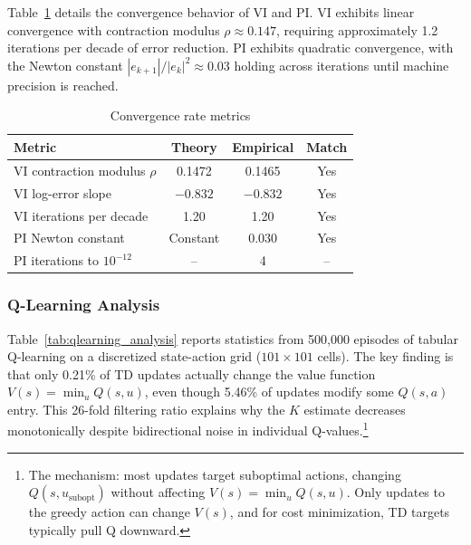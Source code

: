 Table~\ref{tab:convergence_rates} details the convergence behavior of VI and PI. VI exhibits linear convergence with contraction modulus $\rho \approx 0.147$, requiring approximately 1.2 iterations per decade of error reduction. PI exhibits quadratic convergence, with the Newton constant $|e_{k+1}|/|e_k|^2 \approx 0.03$ holding across iterations until machine precision is reached.

\begin{table}[h!]
\centering
\caption{Convergence rate metrics}
\label{tab:convergence_rates}
\begin{tabular}{l|c|c|c}
\hline
Metric & Theory & Empirical & Match \\
\hline
VI contraction modulus $\rho$ & 0.1472 & 0.1465 & Yes \\
VI log-error slope & $-0.832$ & $-0.832$ & Yes \\
VI iterations per decade & 1.20 & 1.20 & Yes \\
PI Newton constant & Constant & 0.030 & Yes \\
PI iterations to $10^{-12}$ & -- & 4 & -- \\
\hline
\end{tabular}
\end{table}

\subsubsection{Q-Learning Analysis}

Table~\ref{tab:qlearning_analysis} reports statistics from 500,000 episodes of tabular Q-learning on a discretized state-action grid ($101 \times 101$ cells). The key finding is that only 0.21\% of TD updates actually change the value function $V(s) = \min_u Q(s,u)$, even though 5.46\% of updates modify some $Q(s,a)$ entry. This 26-fold filtering ratio explains why the $K$ estimate decreases monotonically despite bidirectional noise in individual Q-values.\footnote{The mechanism: most updates target suboptimal actions, changing $Q(s, u_{\text{subopt}})$ without affecting $V(s) = \min_u Q(s,u)$. Only updates to the greedy action can change $V(s)$, and for cost minimization, TD targets typically pull Q downward.}

